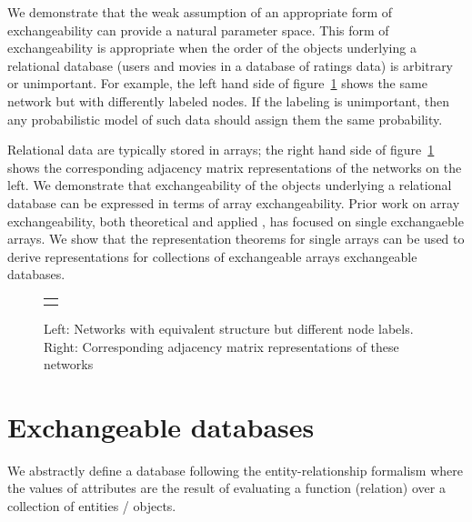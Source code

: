 We demonstrate that the weak assumption of an appropriate form of exchangeability can provide a natural parameter space.
This form of exchangeability is appropriate when the order of the objects underlying a relational database (\eg users and movies in a database of ratings data) is arbitrary or unimportant.
For example, the left hand side of figure~\ref{fig:exchangeable} shows the same network but with differently labeled nodes.
If the labeling is unimportant, then any probabilistic model of such data should assign them the same probability.

\newpage
Relational data are typically stored in arrays; the right hand side of figure~\ref{fig:exchangeable} shows the corresponding adjacency matrix representations of the networks on the left.
We demonstrate that exchangeability of the objects underlying a relational database can be expressed in terms of array exchangeability.
Prior work on array exchangeability, both theoretical \citep[e.g.][]{Hoover1979, Aldous1981a, Hoover1982, Kallenberg1999a, Diaconis2007, Aldous2010, Austin2012, Choi2012, Wolfe2013} and applied \citep[e.g.][]{Hoff2007a,Roy2009,Lloyd2012}, has focused on single exchangaeble arrays.
We show that the representation theorems for single arrays can be used to derive representations for collections of exchangeable arrays \ie exchangeable databases.

\begin{figure}[t]
\centering
\begin{tabular}{c}
\tiny 
\end{tabular}
\caption{Left: Networks with equivalent structure but different node labels. Right: Corresponding adjacency matrix representations of these networks}
\label{fig:exchangeable}
\end{figure}

\section{Exchangeable databases}

We abstractly define a database following the entity-relationship formalism \citep[e.g.][]{Ullman2002} where the values of attributes are the result of evaluating a function (relation) over a collection of entities / objects.

